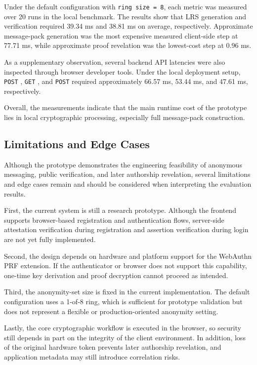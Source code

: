 \documentclass[letterpaper,11pt]{article}
\begin{document}
Under the default configuration with \texttt{ring size = 8}, each metric was measured over 20 runs in the local benchmark. The results show that LRS generation and verification required 39.34 ms and 38.81 ms on average, respectively. Approximate message-pack generation was the most expensive measured client-side step at 77.71 ms, while approximate proof revelation was the lowest-cost step at 0.96 ms.

As a supplementary observation, several backend API latencies were also inspected through browser developer tools. Under the local deployment setup, \texttt{POST} , \texttt{GET} , and \texttt{POST}  required approximately 66.57 ms, 53.44 ms, and 47.61 ms, respectively.

Overall, the measurements indicate that the main runtime cost of the prototype lies in local cryptographic processing, especially full message-pack construction.

\subsection{Limitations and Edge Cases}
Although the prototype demonstrates the engineering feasibility of anonymous messaging, public verification, and later authorship revelation, several limitations and edge cases remain and should be considered when interpreting the evaluation results.

First, the current system is still a research prototype. Although the frontend supports browser-based registration and authentication flows, server-side attestation verification during registration and assertion verification during login are not yet fully implemented.

Second, the design depends on hardware and platform support for the WebAuthn PRF extension. If the authenticator or browser does not support this capability, one-time key derivation and proof decryption cannot proceed as intended.

Third, the anonymity-set size is fixed in the current implementation. The default configuration uses a 1-of-8 ring, which is sufficient for prototype validation but does not represent a flexible or production-oriented anonymity setting.

Lastly, the core cryptographic workflow is executed in the browser, so security still depends in part on the integrity of the client environment. In addition, loss of the original hardware token prevents later authorship revelation, and application metadata may still introduce correlation risks.
\end{document}

